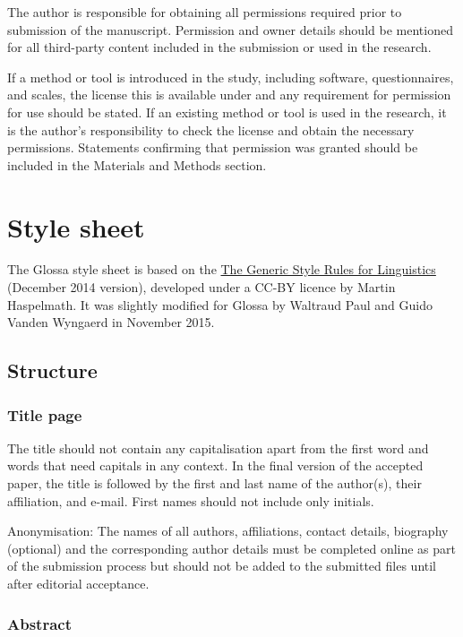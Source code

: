 \documentclass[charis,linguex]{glossa}
\begin{document}
The author is responsible for obtaining all permissions required prior to submission of the manuscript. Permission and owner details should be mentioned for all third-party content included in the submission or used in the research.

If a method or tool is introduced in the study, including software, questionnaires, and scales, the license this is available under and any requirement for permission for use should be stated. If an existing method or tool is used in the research, it is the author's responsibility to check the license and obtain the necessary permissions. Statements confirming that permission was granted should be included in the Materials and Methods section.


\section{Style sheet}\label{ss}

The Glossa style sheet is based on the \href{http://www.eva.mpg.de/linguistics/past-research-resources/resources/generic-style-rules.html}{The Generic Style Rules for Lin\-guistics} (December 2014 version), developed under a CC-BY licence by Martin Haspelmath. It was slightly modified for Glossa by Waltraud Paul and Guido Vanden Wyngaerd in November 2015. 

\subsection{Structure}

\subsubsection{Title page}

The title should not contain any capitalisation apart from the first word and words that need capitals in any context. In the final version of the accepted paper, the title is followed by the first and last name of the author(s), their affiliation, and e-mail. First names should not include only initials.  

Anonymisation: The names of all authors, affiliations, contact details, biography (optional) and the corresponding author details must be completed online as part of the submission process but should not be added to the submitted files until after editorial acceptance.

\subsubsection{Abstract}
\end{document}
